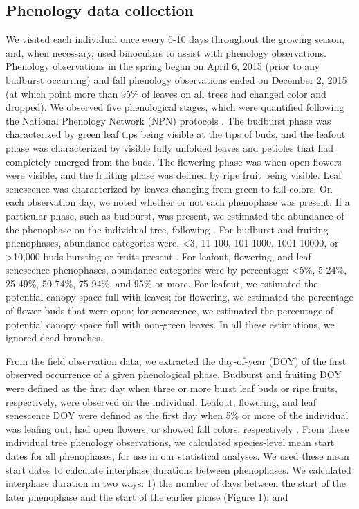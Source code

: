 \documentclass{article}
\begin{document}
\subsection*{Phenology data collection}
We visited each individual once every 6-10 days throughout the growing season, and, when necessary, used binoculars to assist with phenology observations. Phenology observations in the spring began on April 6, 2015 (prior to any budburst occurring) and fall phenology observations ended on December 2, 2015 (at which point more than 95\% of leaves on all trees had changed color and dropped). We observed five phenological stages, which were quantified following the National Phenology Network (NPN) protocols \citep[for a full description see][]{denny2014}. The budburst phase was characterized by green leaf tips being visible at the tips of buds, and the leafout phase was characterized by visible fully unfolded leaves and petioles that had completely emerged from the buds. The flowering phase was when open flowers were visible, and the fruiting phase was defined by ripe fruit being visible. Leaf senescence was characterized by leaves changing from green to fall colors. On each observation day, we noted whether or not each phenophase was present. If a particular phase, such as budburst, was present, we estimated the abundance of the phenophase on the individual tree, following \citet{denny2014}. For budburst and fruiting phenophases, abundance categories were, <3, 11-100, 101-1000, 1001-10000, or >10,000 buds bursting or fruits present \citep{denny2014}. For leafout, flowering, and leaf senescence phenophases, abundance categories were by percentage: <5\%, 5-24\%, 25-49\%, 50-74\%, 75-94\%, and 95\%  or more. For leafout, we estimated the potential canopy space full with leaves; for flowering, we estimated the percentage of flower buds that were open; for senescence, we estimated the percentage of potential canopy space full with non-green leaves. In all these estimations, we ignored dead branches. 
\par From the field observation data, we extracted the day-of-year (DOY) of the first observed occurrence of a given phenological phase. Budburst and fruiting DOY were defined as the first day when three or more burst leaf buds or ripe fruits, respectively, were observed on the individual. Leafout, flowering, and leaf senescence DOY were defined as the first day when 5\% or more of the individual was leafing out, had open flowers, or showed fall colors, respectively \citep{denny2014}. 
From these individual tree phenology observations, we calculated species-level mean start dates for all phenophases, for use in our statistical analyses. We used these mean start dates to calculate interphase durations between phenophases. We calculated interphase duration in two ways: 1) the number of days between the start of the later phenophase and the start of the earlier phase (Figure 1); and  
\end{document}
